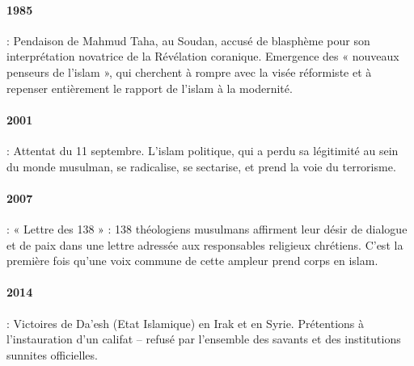 \paragraph{1985 } : Pendaison de Mahmud Taha, au Soudan, accusé de blasphème pour son interprétation novatrice de la Révélation coranique. Emergence des « nouveaux penseurs de l’islam », qui cherchent à rompre avec la visée réformiste et à repenser entièrement le rapport de l’islam à la modernité.
\paragraph{2001 } : Attentat du 11 septembre. L’islam politique, qui a perdu sa légitimité au sein du monde musulman, se radicalise, se sectarise, et prend la voie du terrorisme.

\paragraph{2007 } : « Lettre des 138 » : 138 théologiens musulmans affirment leur désir de dialogue et de paix dans une lettre adressée aux responsables religieux chrétiens. C’est la première fois qu’une voix commune de cette ampleur prend corps en islam.
\paragraph{2014 } : Victoires de Da’esh (Etat Islamique) en Irak et en Syrie. Prétentions à l’instauration d’un califat – refusé par l’ensemble des savants et des institutions sunnites officielles.
 
